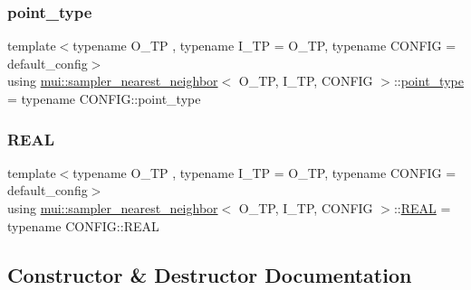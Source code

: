 \subsubsection{\texorpdfstring{point\+\_\+type}{point\_type}}
{\footnotesize\ttfamily template$<$typename O\+\_\+\+TP , typename I\+\_\+\+TP  = O\+\_\+\+TP, typename C\+O\+N\+F\+IG  = default\+\_\+config$>$ \\
using \hyperlink{classmui_1_1sampler__nearest__neighbor}{mui\+::sampler\+\_\+nearest\+\_\+neighbor}$<$ O\+\_\+\+TP, I\+\_\+\+TP, C\+O\+N\+F\+IG $>$\+::\hyperlink{classmui_1_1sampler__nearest__neighbor_ace9bf5dd74eb5ff63c05941c5cf2a825}{point\+\_\+type} =  typename C\+O\+N\+F\+I\+G\+::point\+\_\+type}

\mbox{\label{classmui_1_1sampler__nearest__neighbor_ab3c299b171cbfaba19246f02644c062a}} 
\subsubsection{\texorpdfstring{R\+E\+AL}{REAL}}
{\footnotesize\ttfamily template$<$typename O\+\_\+\+TP , typename I\+\_\+\+TP  = O\+\_\+\+TP, typename C\+O\+N\+F\+IG  = default\+\_\+config$>$ \\
using \hyperlink{classmui_1_1sampler__nearest__neighbor}{mui\+::sampler\+\_\+nearest\+\_\+neighbor}$<$ O\+\_\+\+TP, I\+\_\+\+TP, C\+O\+N\+F\+IG $>$\+::\hyperlink{classmui_1_1sampler__nearest__neighbor_ab3c299b171cbfaba19246f02644c062a}{R\+E\+AL} =  typename C\+O\+N\+F\+I\+G\+::\+R\+E\+AL}



\subsection{Constructor \& Destructor Documentation}
\mbox{\label{classmui_1_1sampler__nearest__neighbor_adfecb46e4cb07c349505b563b061540b}} 
